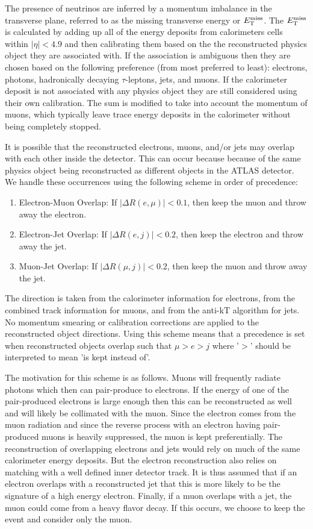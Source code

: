 The presence of neutrinos are inferred by a momentum
imbalance in the transverse plane, referred to as the missing
transverse energy or $E_{\mathrm{T}}^{\mathrm{miss}}$. The $E_{\mathrm{T}}^{\mathrm{miss}}$ is calculated by 
adding up all of 
the energy deposits from calorimeters cells within $|\eta| < 4.9$
and then calibrating them based on the the reconstructed
physics object they are associated with.
If the association is ambiguous then they are chosen based on the following
preference (from most preferred to least): electrons, photons, 
hadronically decaying $\tau$-leptons, jets, and muons.
If the calorimeter deposit is not associated with any physics object
they are still considered using their own calibration.
The sum is modified to take into account the momentum of muons,
which typically leave trace energy deposits
in the calorimeter without being completely stopped.



It is possible that the reconstructed electrons, muons, and/or jets
may overlap with each other inside the detector.  This can occur
because because of the same physics object being reconstructed as different
objects in the ATLAS detector.  We handle these occurrences using the following
scheme in order of precedence:
\begin{enumerate}
	\item Electron-Muon Overlap: If $|\Delta R(e,\mu)| < 0.1$, 
	then keep the muon and throw away the electron.
	\item Electron-Jet Overlap: If $|\Delta R(e,j)| < 0.2$, 
	then keep the electron and throw away the jet.
	\item Muon-Jet Overlap: If $|\Delta R(\mu,j)| < 0.2$, 
	then keep the muon and throw away the jet.
\end{enumerate}
The direction is taken from the calorimeter information for electrons,
from the combined track information for muons, and from the anti-k${\mathrm{T}}$
algorithm for jets.
No momentum smearing or calibration corrections
are applied to the reconstructed object directions. 
Using this scheme means that a precedence is set when 
reconstructed objects overlap such that $\mu > e > j$ where '$>$' should
be interpreted to mean 'is kept instead of'. 

The motivation for this scheme
is as follows. Muons will frequently radiate photons which then can pair-produce
to electrons.  If the energy of one of the pair-produced electrons is 
large enough then this can be reconstructed as well and will likely be collimated
with the muon.  Since the electron comes from the muon radiation and
since the reverse process with an electron having pair-produced muons
is heavily suppressed, the muon is kept preferentially.  The reconstruction
of overlapping electrons and jets
would rely on much of the same calorimeter energy deposits.  But the electron
reconstruction also relies on matching with a well defined inner detector
track.  It is thus assumed that if an electron overlaps with a reconstructed
jet that this is more likely to be the signature of a high energy electron.
Finally, if a muon overlaps with a jet, the muon could come from a heavy flavor 
decay. If this occurs, we choose to keep the event and consider only the muon.


